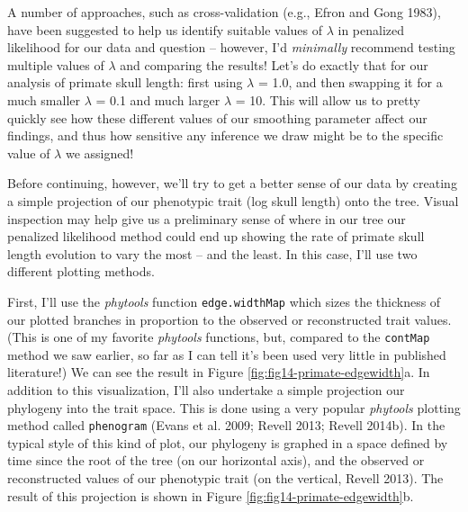 \documentclass[fleqn,10pt,lineno]{wlpeerj} %
\begin{document}
A number of approaches, such as cross-validation (e.g., Efron and Gong 1983), have been suggested to help us identify suitable values of \(\lambda\) in penalized likelihood for our data and question -- however, I'd \emph{minimally} recommend testing multiple values of \(\lambda\) and comparing the results! Let's do exactly that for our analysis of primate skull length: first using \(\lambda\) = 1.0, and then swapping it for a much smaller \(\lambda\) = 0.1 and much larger \(\lambda\) = 10. This will allow us to pretty quickly see how these different values of our smoothing parameter affect our findings, and thus how sensitive any inference we draw might be to the specific value of \(\lambda\) we assigned!

Before continuing, however, we'll try to get a better sense of our data by creating a simple projection of our phenotypic trait (log skull length) onto the tree. Visual inspection may help give us a preliminary sense of where in our tree our penalized likelihood method could end up showing the rate of primate skull length evolution to vary the most -- and the least. In this case, I'll use two different plotting methods.

First, I'll use the \emph{phytools} function \texttt{edge.widthMap} which sizes the thickness of our plotted branches in proportion to the observed or reconstructed trait values. (This is one of my favorite \emph{phytools} functions, but, compared to the \texttt{contMap} method we saw earlier, so far as I can tell it's been used very little in published literature!) We can see the result in Figure \ref{fig:fig14-primate-edgewidth}a. In addition to this visualization, I'll also undertake a simple projection our phylogeny into the trait space. This is done using a very popular \emph{phytools} plotting method called \texttt{phenogram} (Evans et al. 2009; Revell 2013; Revell 2014b). In the typical style of this kind of plot, our phylogeny is graphed in a space defined by time since the root of the tree (on our horizontal axis), and the observed or reconstructed values of our phenotypic trait (on the vertical, Revell 2013). The result of this projection is shown in Figure \ref{fig:fig14-primate-edgewidth}b.
\end{document}
